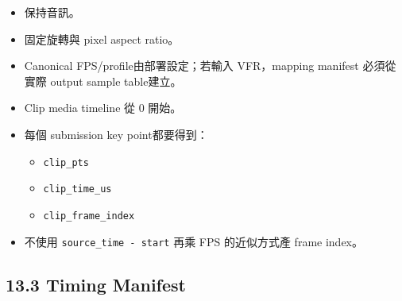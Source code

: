 \documentclass[
  9pt,
  a4paper,
]{article}
\providecommand{\tightlist}{%
  \setlength{\itemsep}{0pt}\setlength{\parskip}{0pt}}
\begin{document}
\begin{itemize}
\tightlist
\item
  保持音訊。
\item
  固定旋轉與 pixel aspect ratio。
\item
  Canonical FPS/profile由部署設定；若輸入 VFR，mapping manifest
  必須從實際 output sample table建立。
\item
  Clip media timeline 從 0 開始。
\item
  每個 submission key point都要得到：

  \begin{itemize}
  \tightlist
  \item
    \texttt{clip\_\allowbreak{}pts}
  \item
    \texttt{clip\_\allowbreak{}time\_\allowbreak{}us}
  \item
    \texttt{clip\_\allowbreak{}frame\_\allowbreak{}index}
  \end{itemize}
\item
  不使用 \texttt{source\_\allowbreak{}time\ -\ start} 再乘 FPS 的近似方式產 frame
  index。
\end{itemize}

\subsection{13.3 Timing Manifest}\label{133-timing-manifest}
\end{document}
